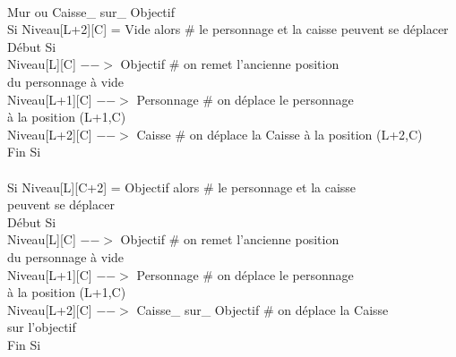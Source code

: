 \documentclass{article}
\begin{document}
\begin{tabbing}
\\ \hspace{4cm} Mur ou Caisse\_ sur\_ Objectif
\\	\hspace{4cm}		Si Niveau[L+2][C] = Vide alors          \# le personnage et la caisse peuvent se déplacer
\\	\hspace{4cm}		Début Si
\\	\hspace{5cm}			Niveau[L][C] $-->$ Objectif 	\# on remet l'ancienne position
\\ \hspace{5cm} du personnage à vide
\\	\hspace{5cm}			Niveau[L+1][C] $-->$ Personnage	\# on déplace le personnage
\\ \hspace{5cm} à la position (L+1,C)
\\	\hspace{5cm}			Niveau[L+2][C] $-->$ Caisse	\# on déplace la Caisse à la position (L+2,C)
\\	\hspace{4cm}		Fin Si
\\
\\	\hspace{4cm}		Si Niveau[L][C+2] = Objectif alors         	\# le personnage et la caisse
\\ \hspace{4cm} peuvent se déplacer
\\	\hspace{4cm}		Début Si
\\	\hspace{5cm}			Niveau[L][C] $-->$ Objectif 		\# on remet l'ancienne position
\\ \hspace{5cm} du personnage à vide
\\	\hspace{5cm}			Niveau[L+1][C] $-->$ Personnage		\# on déplace le personnage
\\ \hspace{5cm} à la position (L+1,C)
\\	\hspace{5cm}			Niveau[L+2][C] $-->$ Caisse\_ sur\_ Objectif	\# on déplace la Caisse
\\ \hspace{5cm} sur l'objectif
\\	\hspace{4cm}		Fin Si

\end{tabbing}
\end{document}
